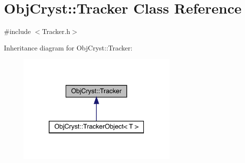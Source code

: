 \hypertarget{class_obj_cryst_1_1_tracker}{}\section{Obj\+Cryst\+::Tracker Class Reference}
\label{class_obj_cryst_1_1_tracker}


{\ttfamily \#include $<$Tracker.\+h$>$}



Inheritance diagram for Obj\+Cryst\+::Tracker\+:
\nopagebreak
\begin{figure}[H]
\begin{center}
\leavevmode
\includegraphics[width=226pt]{class_obj_cryst_1_1_tracker__inherit__graph}
\end{center}
\end{figure}
